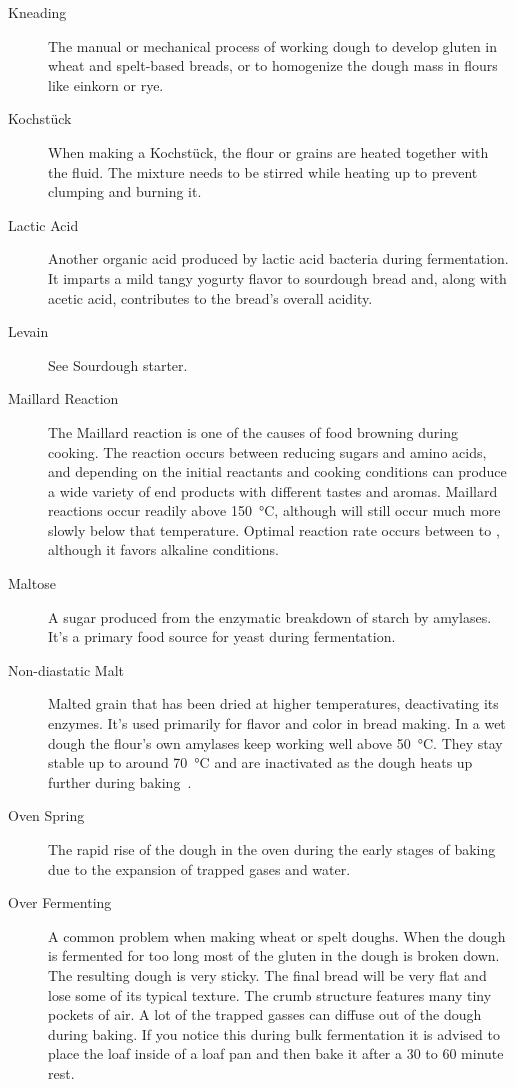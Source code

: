 \begin{description}
\item[Kneading] The manual or mechanical process of working dough to develop gluten
in wheat and spelt-based breads, or to homogenize the dough mass in flours like
einkorn or rye.

\item[Kochstück] When making a Kochstück, the flour or grains are heated
together with the fluid. The mixture needs to be stirred while heating up
to prevent clumping and burning it.

\item[Lactic Acid] Another organic acid produced by lactic acid bacteria during
fermentation. It imparts a mild tangy yogurty flavor to sourdough bread and, along
with acetic acid, contributes to the bread's overall acidity.

\item[Levain] See Sourdough starter.

\item[Maillard Reaction] The Maillard reaction is one of the causes of food browning
during cooking. The reaction occurs between reducing sugars and amino acids, and
depending on the initial reactants and cooking conditions can produce a wide variety
of end products with different tastes and aromas. Maillard reactions occur readily
above \SI{150}{\celsius}, although will still occur much more slowly below that
temperature. Optimal reaction rate occurs between  to ,
although it favors alkaline conditions.

\item[Maltose] A sugar produced from the enzymatic breakdown of starch by amylases.
It's a primary food source for yeast during fermentation.

\item[Non-diastatic Malt] Malted grain that has been dried at higher temperatures,
deactivating its enzymes. It's used primarily for flavor and color in bread making.
In a wet dough the flour's own amylases keep working well above \SI{50}{\celsius}.
They stay stable up to around \SI{70}{\celsius} and are inactivated as the dough
heats up further during baking~\cite{wheat+amylase+singh,innograin+enzymes,reichenberger+amylase}.

\item[Oven Spring] The rapid rise of the dough in the oven during the early stages
of baking due to the expansion of trapped gases and water.

\item[Over Fermenting] A common problem when making wheat or spelt doughs. When the
dough is fermented for too long most of the gluten in the dough is broken down. The
resulting dough is very sticky. The final bread will be very flat and lose some of its
typical texture. The crumb structure features many tiny pockets of air. A lot of the
trapped gasses can diffuse out of the dough during baking. If you notice this during
bulk fermentation it is advised to place the loaf inside of a loaf pan and then bake
it after a 30 to 60 minute rest.


\end{description}
